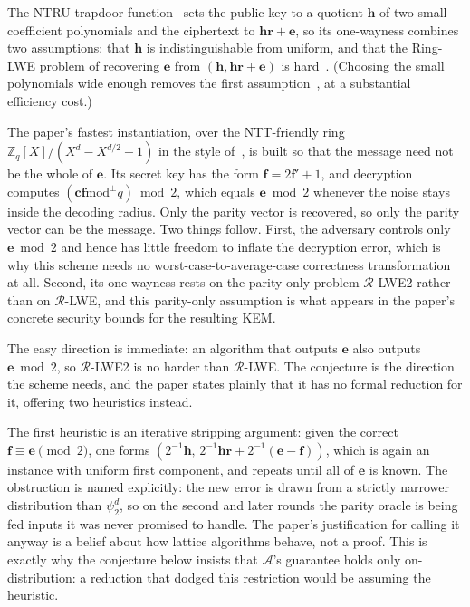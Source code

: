 \documentclass{aicr-conjecture}
\newcommand{\modpm}{\mathbin{\mathrm{mod}^{\pm}}}
\begin{document}
The NTRU trapdoor function~\cite{HPS98} sets the public key to a
quotient $\mathbf{h}$ of two small-coefficient polynomials and the
ciphertext to $\mathbf{h}\mathbf{r} + \mathbf{e}$, so its one-wayness
combines two assumptions: that $\mathbf{h}$ is indistinguishable from
uniform, and that the Ring-LWE problem of recovering $\mathbf{e}$ from
$(\mathbf{h}, \mathbf{h}\mathbf{r}+\mathbf{e})$ is
hard~\cite{SSTX09,LPR10}. (Choosing the small polynomials wide enough
removes the first assumption~\cite{SS11}, at a substantial efficiency
cost.)

The paper's fastest instantiation, over the NTT-friendly ring
$\mathbb{Z}_q[X]/(X^{d}-X^{d/2}+1)$ in the style of~\cite{LS19}, is
built so that the message need not be the whole of $\mathbf{e}$. Its
secret key has the form $\mathbf{f} = 2\mathbf{f}' + 1$, and decryption
computes $(\mathbf{c}\mathbf{f} \modpm q) \bmod 2$, which equals
$\mathbf{e} \bmod 2$ whenever the noise stays inside the decoding
radius. Only the parity vector is recovered, so only the parity vector
can be the message. Two things follow. First, the adversary controls
only $\mathbf{e} \bmod 2$ and hence has little freedom to inflate the
decryption error, which is why this scheme needs no
worst-case-to-average-case correctness transformation at all. Second,
its one-wayness rests on the parity-only problem $\mathcal{R}$-LWE2
rather than on $\mathcal{R}$-LWE, and this parity-only assumption is
what appears in the paper's concrete security bounds for the resulting
KEM.

The easy direction is immediate: an algorithm that outputs $\mathbf{e}$
also outputs $\mathbf{e} \bmod 2$, so $\mathcal{R}$-LWE2 is no harder
than $\mathcal{R}$-LWE. The conjecture is the direction the scheme
needs, and the paper states plainly that it has no formal reduction for
it, offering two heuristics instead.

The first heuristic is an iterative stripping argument: given the
correct $\mathbf{f} \equiv \mathbf{e} \pmod 2$, one forms
$(2^{-1}\mathbf{h},\, 2^{-1}\mathbf{h}\mathbf{r} +
2^{-1}(\mathbf{e}-\mathbf{f}))$, which is again an instance with
uniform first component, and repeats until all of $\mathbf{e}$ is
known. The obstruction is named explicitly: the new error is drawn from
a strictly narrower distribution than $\psi_2^{d}$, so on the second
and later rounds the parity oracle is being fed inputs it was never
promised to handle. The paper's justification for calling it anyway is
a belief about how lattice algorithms behave, not a proof. This is
exactly why the conjecture below insists that $\mathcal{A}$'s guarantee
holds only on-distribution: a reduction that dodged this restriction
would be assuming the heuristic.
\end{document}
